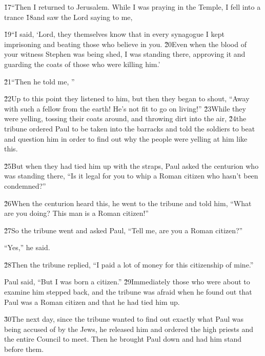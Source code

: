 \v{17}``Then I returned to Jerusalem. While I was praying in the Temple, I fell into a trance \v{18}and saw the Lord saying to me, 

\v{19}``I said, `Lord, they themselves know that in every synagogue I kept imprisoning and beating those who believe in you. \v{20}Even when the blood of your witness Stephen was being shed, I was standing there, approving it and guarding the coats of those who were killing him.'

\v{21}``Then he told me, ''

\v{22}Up to this point they listened to him, but then they began to shout, ``Away with such a fellow from the earth! He's not fit to go on living!'' \v{23}While they were yelling, tossing their coats around, and throwing dirt into the air, \v{24}the tribune ordered Paul to be taken into the barracks and told the soldiers to beat and question him in order to find out why the people were yelling at him like this.

\v{25}But when they had tied him up with the straps, Paul asked the centurion who was standing there, ``Is it legal for you to whip a Roman citizen who hasn't been condemned?''

\v{26}When the centurion heard this, he went to the tribune and told him, ``What are you doing? This man is a Roman citizen!''

\v{27}So the tribune went and asked Paul, ``Tell me, are you a Roman citizen?''

``Yes,'' he said.

\v{28}Then the tribune replied, ``I paid a lot of money for this citizenship of mine.''

Paul said, ``But I was born a citizen.'' \v{29}Immediately those who were about to examine him stepped back, and the tribune was afraid when he found out that Paul was a Roman citizen and that he had tied him up.

\v{30}The next day, since the tribune wanted to find out exactly what Paul was being accused of by the Jews, he released him and ordered the high priests and the entire Council to meet. Then he brought Paul down and had him stand before them.

